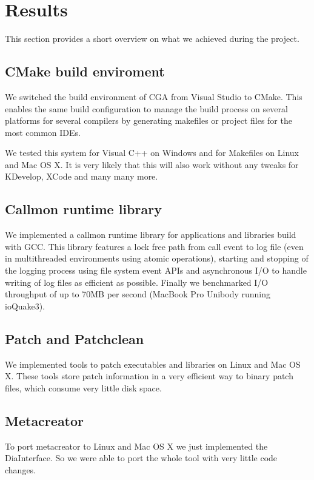 
\section{Results}

This section provides a short overview on what we achieved during the project.

\subsection{CMake build enviroment} We switched the build environment of CGA from Visual Studio to CMake. This enables the same build configuration to manage the build process on several platforms for several compilers by generating makefiles or project files  for the most common IDEs.

We tested this system for Visual C++ on Windows and for Makefiles on Linux and Mac OS X. It is very likely that this will also work without any tweaks for KDevelop, XCode and many many more.

\subsection{Callmon runtime library} We implemented a callmon runtime library for applications and libraries build with GCC. This library features a lock free path from call event to log file (even in multithreaded environments using atomic operations), starting and stopping of the logging process using file system event APIs and asynchronous I/O to handle writing of log files as efficient as possible. Finally we benchmarked I/O throughput of up to 70MB per second (MacBook Pro Unibody running ioQuake3).

\subsection{Patch and Patchclean} We implemented tools to patch executables and libraries on Linux and Mac OS X. These tools store patch information in a very efficient way to binary patch files, which consume very little disk space.


\subsection{Metacreator} To port metacreator to Linux and Mac OS X we just implemented the DiaInterface. So we were able to port the whole tool with very little code changes.

